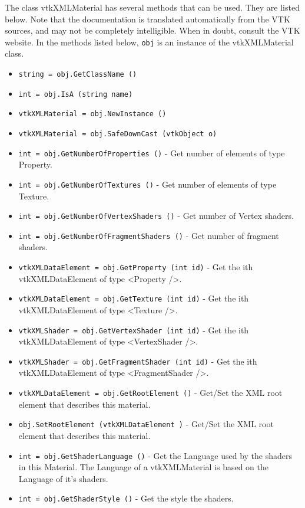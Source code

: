 The class vtkXMLMaterial has several methods that can be used.
  They are listed below.
Note that the documentation is translated automatically from the VTK sources,
and may not be completely intelligible.  When in doubt, consult the VTK website.
In the methods listed below, \verb|obj| is an instance of the vtkXMLMaterial class.
\begin{itemize}
\item  \verb|string = obj.GetClassName ()|

\item  \verb|int = obj.IsA (string name)|

\item  \verb|vtkXMLMaterial = obj.NewInstance ()|

\item  \verb|vtkXMLMaterial = obj.SafeDownCast (vtkObject o)|

\item  \verb|int = obj.GetNumberOfProperties ()| -  Get number of elements of type Property.

\item  \verb|int = obj.GetNumberOfTextures ()| -  Get number of elements of type Texture.

\item  \verb|int = obj.GetNumberOfVertexShaders ()| -  Get number of Vertex shaders.

\item  \verb|int = obj.GetNumberOfFragmentShaders ()| -  Get number of fragment shaders.

\item  \verb|vtkXMLDataElement = obj.GetProperty (int id)| -  Get the ith vtkXMLDataElement of type <Property />.

\item  \verb|vtkXMLDataElement = obj.GetTexture (int id)| -  Get the ith vtkXMLDataElement of type <Texture />.

\item  \verb|vtkXMLShader = obj.GetVertexShader (int id)| -  Get the ith vtkXMLDataElement of type <VertexShader />.

\item  \verb|vtkXMLShader = obj.GetFragmentShader (int id)| -  Get the ith vtkXMLDataElement of type <FragmentShader />.

\item  \verb|vtkXMLDataElement = obj.GetRootElement ()| -  Get/Set the XML root element that describes this material.

\item  \verb|obj.SetRootElement (vtkXMLDataElement )| -  Get/Set the XML root element that describes this material.

\item  \verb|int = obj.GetShaderLanguage ()| -  Get the Language used by the shaders in this Material.
 The Language of a vtkXMLMaterial is based on the Language of it's
 shaders. 

\item  \verb|int = obj.GetShaderStyle ()| -  Get the style the shaders.
 

\end{itemize}
